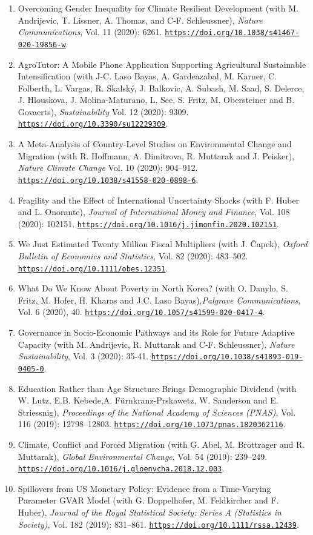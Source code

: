 \documentclass[10pt]{res} %
\newcommand{\doiurl}[1]{\href{https://doi.org/#1}{\nolinkurl{https://doi.org/#1}}}
\begin{document}
\begin{resume}
\begin{enumerate}
\item Overcoming Gender Inequality for Climate Resilient Development (with M. Andrijevic, T. Lissner, A. Thomas, and C-F. Schleussner), \textit{Nature Communications}, Vol. 11 (2020): 6261. \doiurl{10.1038/s41467-020-19856-w}.
\item AgroTutor: A Mobile Phone Application Supporting Agricultural Sustainable Intensification (with J-C. Laso Bayas, A. Gardeazabal, M. Karner, C. Folberth, L. Vargas, R. Skalsk\'y, J. Balkovic, A. Subash, M. Saad, S. Delerce, J. Hlouskova, J. Molina-Maturano, L. See, S. Fritz, M. Obersteiner and B. Govaerts), \textit{Sustainability} Vol. 12 (2020): 9309. \doiurl{10.3390/su12229309}.
\item A Meta-Analysis of Country-Level Studies on Environmental Change and Migration (with R. Hoffmann, A. Dimitrova, R. Muttarak and J. Peisker), \textit{Nature Climate Change} Vol. 10 (2020): 904–912. \doiurl{10.1038/s41558-020-0898-6}.
\item Fragility and the Effect of International Uncertainty Shocks (with F. Huber and L. Onorante), \textit{Journal of International Money and Finance}, Vol. 108 (2020): 102151. \doiurl{10.1016/j.jimonfin.2020.102151}.
\item We Just Estimated Twenty Million Fiscal Multipliers (with J. \v{C}apek), \textit{Oxford Bulletin of Economics and Statistics}, Vol. 82 (2020): 483--502. \doiurl{10.1111/obes.12351}.
\item What Do We Know About Poverty in North Korea? (with O. Danylo, S. Fritz, M. Hofer, H. Kharas and J.C. Laso Bayas),\textit{Palgrave Communications}, Vol. 6 (2020), 40. \doiurl{10.1057/s41599-020-0417-4}.
\item Governance in Socio-Economic Pathways and its Role for Future Adaptive Capacity (with M. Andrijevic, R. Muttarak and C-F. Schleussner), \textit{Nature Sustainability}, Vol. 3 (2020): 35-41. \doiurl{10.1038/s41893-019-0405-0}.
\item Education Rather than Age Structure Brings Demographic Dividend (with W. Lutz, E.B. Kebede,A. F\"urnkranz-Prskawetz, W. Sanderson and E. Striessnig),\textit{ Proceedings of the National Academy of Sciences (PNAS)}, Vol. 116 (2019): 12798--12803. \doiurl{10.1073/pnas.1820362116}.
\item Climate, Conflict and Forced Migration (with G. Abel, M. Brottrager and R. Muttarak), \textit{Global Environmental Change}, Vol. 54 (2019): 239--249. \doiurl{10.1016/j.gloenvcha.2018.12.003}.
\item Spillovers from US Monetary Policy: Evidence from a Time-Varying Parameter GVAR Model (with G. Doppelhofer, M. Feldkircher and F. Huber),\textit{ Journal of the Royal Statistical Society: Series A (Statistics in Society)}, Vol. 182 (2019):  831--861. \doiurl{10.1111/rssa.12439}.

\end{enumerate}
\end{resume}
\end{document}
